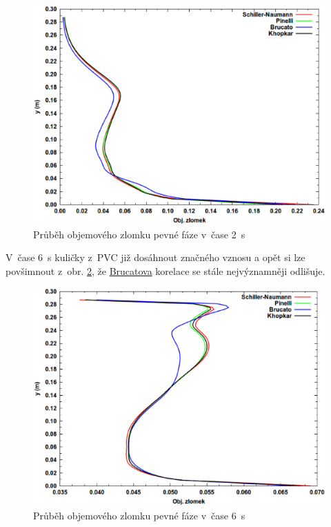 \begin{figure}[h!]
\begin{center}
\includegraphics[scale=0.47]{images/Vol-2.eps}
\caption{Průběh objemového zlomku pevné fáze v~čase \SI{2}{\second}}
\label{fig:vol2}
\end{center}
\end{figure} 

\vspace{-9mm}

\noindent V~čase \SI{6}{\second} kuličky z~PVC již dosáhnout značného vznosu a opět si lze povšimnout z~obr. \ref{fig:vol6}, že \hyperlink{hyp:cds}{Brucatova} korelace se stále nejvýznamněji odlišuje.  

\begin{figure}[h!]
\begin{center}
\includegraphics[scale=0.47]{images/Vol-6.eps}
\caption{Průběh objemového zlomku pevné fáze v~čase \SI{6}{\second}}
\label{fig:vol6}
\end{center}
\end{figure} 

